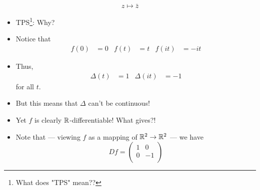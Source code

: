 \documentclass[../notes.tex]{subfiles}
\begin{document}
\begin{itemize}
\begin{equation*}
        z \mapsto \bar{z}
    \end{equation*}
    \begin{itemize}
        \item TPS\footnote{What does "TPS" mean??}: Why?
        \item Notice that
        \begin{align*}
            f(0) &= 0&
            f(t) &= t&
            f(it) &= -it
        \end{align*}
        \item Thus,
        \begin{align*}
            \Delta(t) &= 1&
            \Delta(it) &= -1
        \end{align*}
        for all $t$.
        \item But this means that $\Delta$ can't be continuous!
        \item Yet $f$ is clearly $\mathbb{R}$-differentiable! What gives?!
        \item Note that --- viewing $f$ as a mapping of $\mathbb{R}^2\to\mathbb{R}^2$ --- we have
        \begin{equation*}
            Df =
            \begin{pmatrix}
                1 & 0\\
                0 & -1\\
            \end{pmatrix}
        \end{equation*}
    \end{itemize}
\end{itemize}
\end{document}
